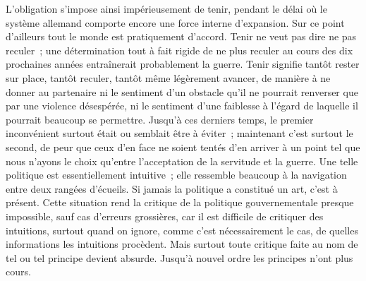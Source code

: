\documentclass[french,twoside]{book} %
\begin{document}
L'obligation s'impose ainsi impérieusement de tenir, pendant le délai où le système allemand comporte encore une force interne d'expansion. Sur ce point d'ailleurs tout le monde est pratiquement d'accord. Tenir ne veut pas dire ne pas reculer ; une détermination tout à fait rigide de ne plus reculer au cours des dix prochaines années entraînerait probablement la guerre. Tenir signifie tantôt rester sur place, tantôt reculer, tantôt même légèrement avancer, de manière à ne donner au partenaire ni le sentiment d'un obstacle qu'il ne pour­rait renverser que par une violence désespérée, ni le sentiment d'une faiblesse à l'égard de laquelle il pourrait beaucoup se permettre. Jusqu'à ces derniers temps, le premier inconvénient surtout était ou semblait être à éviter ; maintenant c'est surtout le second, de peur que ceux d'en face ne soient tentés d'en arriver à un point tel que nous n'ayons le choix qu'entre l'acceptation de la servitude et la guerre. Une telle politique est essentiellement intuitive ; elle ressemble beaucoup à la navigation entre deux rangées d'écueils. Si jamais la politique a constitué un art, c'est à présent. Cette situation rend la critique de la politique gouvernementale presque impossible, sauf cas d'erreurs grossiè­res, car il est difficile de critiquer des intuitions, surtout quand on ignore, comme c'est nécessairement le cas, de quelles informations les intuitions procèdent. Mais surtout toute critique faite au nom de tel ou tel principe devient absurde. Jusqu'à nouvel ordre les principes n'ont plus cours.\par
\end{document}
